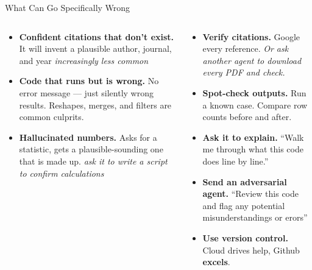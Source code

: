 \documentclass[aspectratio=169, 10pt]{beamer}
\begin{document}
\begin{frame}{What Can Go Specifically Wrong}
\begin{columns}[T]
\begin{column}{0.47\textwidth}
\begin{tcolorbox}[colback=SoftCoral!8, colframe=SoftCoral, boxrule=0.6pt, arc=3pt, left=5pt, right=5pt, top=3pt, bottom=3pt, title={\color{SoftCoral}\faExclamation\; The scary failures}, fonttitle=\small\bfseries, coltitle=SoftCoral]
\scriptsize
\begin{itemize}\setlength{\itemsep}{1pt}
  \item \textbf{Confident citations that don't exist.} It will invent a plausible author, journal, and year \textit{increasingly less common}
  \item \textbf{Code that runs but is wrong.} No error message --- just silently wrong results. Reshapes, merges, and filters are common culprits.
  \item \textbf{Hallucinated numbers.} Asks for a statistic, gets a plausible-sounding one that is made up. \textit{ask it to write a script to confirm calculations}
\end{itemize}
\end{tcolorbox}
\end{column}
\begin{column}{0.47\textwidth}
\begin{tcolorbox}[keybox, title={\faLock\quad How to protect yourself}]
\scriptsize
\begin{itemize}\setlength{\itemsep}{1pt}
  \item \textbf{Verify citations.} Google every reference. \textit{Or ask another agent to download every PDF and check.}
  \item \textbf{Spot-check outputs.} Run a known case. Compare row counts before and after.
  \item \textbf{Ask it to explain.} ``Walk me through what this code does line by line.''
  \item \textbf{Send an adversarial agent.} ``Review this code and flag any potential misunderstandings or erors''
  \item \textbf{Use version control.} Cloud drives help, Github \textbf{excels}.
\end{itemize}
\end{tcolorbox}
\end{column}
\end{columns}
\end{frame}
\end{document}
